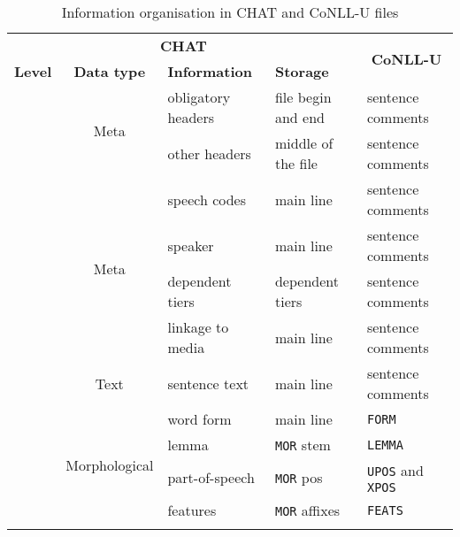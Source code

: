 \begin{table}[h!]
\caption {Information organisation in CHAT and CoNLL-U files} \label{tab:info}
\centering
\begin{tabularx}{\widefigurewidth}{@{}lcXll@{}}
\toprule
\multicolumn{4}{c}{\textbf{CHAT}}& \multicolumn{1}{c}{\multirow{2}{*}{\textbf{CoNLL-U}}}\\
\cmidrule(lr){1-4}
\textbf{Level}& \textbf{Data type} & \textbf{Information} & \textbf{Storage} &\multicolumn{1}{l}{}\\
\midrule\addlinespace
\multicolumn{1}{l}{\multirow{2}{*}{\textbf{File}}}&\multicolumn{1}{c}{\multirow{2}{*}{Meta}}& obligatory headers    & file begin and end & sentence comments\\
\multicolumn{1}{l}{\multirow{2}{*}{}}&\multicolumn{1}{c}{\multirow{2}{*}{}}& other headers  & middle of the file & sentence comments\\\addlinespace
\cmidrule[0.1pt](lr{1.75em}){1-3}
\addlinespace
\multicolumn{1}{l}{\multirow{5}{*}{\textbf{Sentence}}}&\multicolumn{1}{c}{\multirow{4}{*}{Meta}}& speech codes & main line & sentence comments\\
\multicolumn{1}{l}{\multirow{5}{*}{}}&\multicolumn{1}{c}{\multirow{4}{*}{}}& speaker          & main line & sentence comments\\
\multicolumn{1}{l}{\multirow{5}{*}{}}&\multicolumn{1}{c}{\multirow{4}{*}{}}& dependent tiers  & dependent tiers & sentence comments\\
\multicolumn{1}{l}{\multirow{5}{*}{}}&\multicolumn{1}{c}{\multirow{4}{*}{}}& linkage to media  & main line & sentence comments\\\addlinespace
\multicolumn{1}{l}{\multirow{5}{*}{}}&\multicolumn{1}{c}{\multirow{1}{*}{Text}}& sentence text  & main line & sentence comments\\
\addlinespace
\cmidrule[0.1pt](lr{1.75em}){1-3}
\addlinespace
\multicolumn{1}{l}{\multirow{11}{*}{\textbf{Token}}}  &\multicolumn{1}{c}{\multirow{4}{*}{Morphological}}& word form         & main line & \texttt{FORM}\\
\multicolumn{1}{l}{\multirow{11}{*}{}}&\multicolumn{1}{c}{\multirow{4}{*}{}}& lemma           & \texttt{MOR} stem& \texttt{LEMMA}\\
\multicolumn{1}{l}{\multirow{11}{*}{}}&\multicolumn{1}{c}{\multirow{4}{*}{}}& part-of-speech  & \texttt{MOR} pos& \texttt{UPOS} and \texttt{XPOS}\\
\multicolumn{1}{l}{\multirow{11}{*}{}}&\multicolumn{1}{c}{\multirow{4}{*}{}}& features        & \texttt{MOR} affixes& \texttt{FEATS}\\\addlinespace

\end{tabularx}
\end{table}
